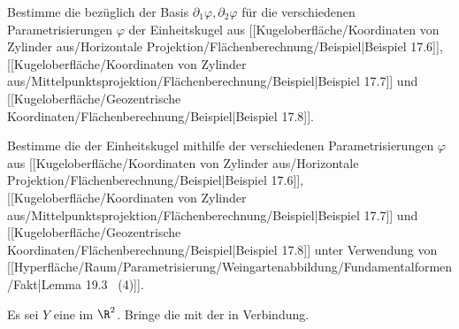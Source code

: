 {}
{

Bestimme die
bezüglich der Basis $\partial_1 \varphi, \partial_2 \varphi$ für die verschiedenen Parametrisierungen $\varphi$ der Einheitskugel aus
[[Kugeloberfläche/Koordinaten von Zylinder aus/Horizontale Projektion/Flächenberechnung/Beispiel|Beispiel 17.6]],
[[Kugeloberfläche/Koordinaten von Zylinder aus/Mittelpunktsprojektion/Flächenberechnung/Beispiel|Beispiel 17.7]]
und
[[Kugeloberfläche/Geozentrische Koordinaten/Flächenberechnung/Beispiel|Beispiel 17.8]].

}
{} {}

{}
{

Bestimme die
der Einheitskugel mithilfe der verschiedenen Parametrisierungen $\varphi$  aus
[[Kugeloberfläche/Koordinaten von Zylinder aus/Horizontale Projektion/Flächenberechnung/Beispiel|Beispiel 17.6]],
[[Kugeloberfläche/Koordinaten von Zylinder aus/Mittelpunktsprojektion/Flächenberechnung/Beispiel|Beispiel 17.7]]
und
[[Kugeloberfläche/Geozentrische Koordinaten/Flächenberechnung/Beispiel|Beispiel 17.8]]
unter Verwendung von
[[Hyperfläche/Raum/Parametrisierung/Weingartenabbildung/Fundamentalformen/Fakt|Lemma 19.3  (4)]].

}
{} {}

{}
{

Es sei $Y$ eine
im $\R^2$. Bringe die
mit der
in Verbindung.

}
{} {}

